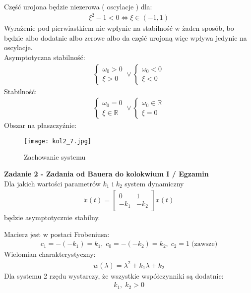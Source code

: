 \documentclass[a4paper,11pt]{article}
\begin{document}
Część urojona będzie niezerowa ( oscylacje ) dla:
\begin{align*}
\xi ^{2} - 1 < 0 \Leftrightarrow \xi \in (-1,1) 
\end{align*}
Wyrażenie pod pierwiastkiem nie wpłynie na stabilność w żaden sposób, bo będzie albo dodatnie albo zerowe albo da część urojoną więc wpływa jedynie na oscylacje. \\
Asymptotyczna stabilność:
\begin{align*}
\begin{cases}
\omega _{0} > 0 \\
\xi > 0
\end{cases}
\lor
\begin{cases}
\omega _{0} < 0 \\
\xi < 0
\end{cases}
\end{align*}
Stabilność:
\begin{align*}
\begin{cases}
\omega _{0} = 0 \\
\xi \in \mathbb{R}
\end{cases}
\lor
\begin{cases}
\omega _{0} \in \mathbb{R} \\
\xi = 0
\end{cases}
\end{align*}
Obszar na płaszczyźnie:
\begin{figure}[H]
\centerline{\texttt{[image: kol2\_7.jpg]}}
\caption{Zachowanie systemu}
\label{fig:kol2_7}
\end{figure}

\newpage
\begin{framed}
\textbf{Zadanie 2 - Zadania od Bauera do kolokwium I / Egzamin} \\ 
Dla jakich wartości parametrów \( k_{1} \) i \( k_{2} \) system dynamiczny 
\begin{align*}
\dot{x}(t)=
\begin{bmatrix}
0 & 1 \\
-k_{1} & -k_{2}
\end{bmatrix}
x(t)
\end{align*}
będzie asymptotycznie stabilny. 
\end{framed}
Macierz jest w postaci Frobeniusa:
\begin{align*}
c_{1} = -(-k_{1})=k_1, \; c_0 = -(-k_2)=k_2, \; c_2 = 1 \; \text{(zawsze)}
\end{align*}
Wielomian charakterystyczny:
\begin{align*}
w(\lambda)=\lambda ^{2} + k_1 \lambda + k_2
\end{align*}
Dla systemu 2 rzędu wystarczy, że wszystkie współczynniki są dodatnie:
\begin{align*}
k_{1}, \; k_{2} > 0
\end{align*}
\end{document}

